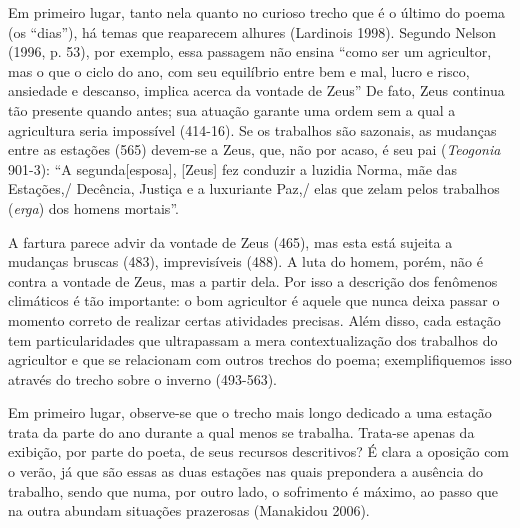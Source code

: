 Em primeiro lugar, tanto nela quanto no curioso trecho que é o último do
poema (os ``dias''), há temas que reaparecem alhures (Lardinois 1998).
Segundo Nelson (1996, p. 53), por exemplo, essa passagem não ensina
``como ser um agricultor, mas o que o ciclo do ano, com seu equilíbrio
entre bem e mal, lucro e risco, ansiedade e descanso, implica acerca da
vontade de Zeus'' De fato, Zeus continua tão presente quando antes; sua
atuação garante uma ordem sem a qual a agricultura seria impossível
(414-16). Se os trabalhos são sazonais, as mudanças entre as estações
(565) devem-se a Zeus, que, não por acaso, é seu pai (\emph{Teogonia}
901-3): ``A segunda{[}esposa{]}, {[}Zeus{]} fez conduzir a luzidia
Norma, mãe das Estações,/ Decência, Justiça e a luxuriante Paz,/ elas
que zelam pelos trabalhos (\emph{erga}) dos homens mortais''.

A fartura parece advir da vontade de Zeus (465), mas esta está sujeita a
mudanças bruscas (483), imprevisíveis (488). A luta do homem, porém, não
é contra a vontade de Zeus, mas a partir dela. Por isso a descrição dos
fenômenos climáticos é tão importante: o bom agricultor é aquele que
nunca deixa passar o momento correto de realizar certas atividades
precisas. Além disso, cada estação tem particularidades que ultrapassam
a mera contextualização dos trabalhos do agricultor e que se relacionam
com outros trechos do poema; exemplifiquemos isso através do trecho
sobre o inverno (493-563).

Em primeiro lugar, observe-se que o trecho mais longo dedicado a uma
estação trata da parte do ano durante a qual menos se trabalha. Trata-se
apenas da exibição, por parte do poeta, de seus recursos descritivos? É
clara a oposição com o verão, já que são essas as duas estações nas
quais prepondera a ausência do trabalho, sendo que numa, por outro lado,
o sofrimento é máximo, ao passo que na outra abundam situações
prazerosas (Manakidou 2006).

